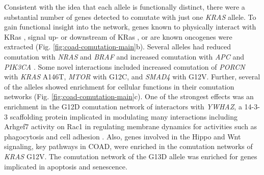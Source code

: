\documentclass[english, 10pt, letterpaper]{article}
\newcommand{\KRAS}{\emph{KRAS}}
\newcommand{\kras}{KRas}
\begin{document}
Consistent with the idea that each allele is functionally distinct, there were a substantial number of genes detected to comutate with just one \KRAS{} allele.
To gain functional insight into the network, genes known to physically interact with \kras{} \cite{Kovalski2019}, signal up- or downstream of \kras{} \cite{Kanehisa2017, Kanehisa2016KEGGAnnotation.}, or are known oncogenes \cite{Bamford2004TheWebsite., Sondka2018} were extracted (Fig. \ref{fig:coad-comutation-main}b).
Several alleles had reduced comutation with \emph{NRAS} and \emph{BRAF} and increased comutation with \emph{APC} and \emph{PIK3CA} \cite{Sensi2006MutuallyMelanoma., Jauhri2017, Seth2009ConcomitantCancer., Cisowski2016, Janssen2006, Sakai2018, Kennedy2011, Wang2013, Green2015, Yeang2008CombinatorialCancer., CancerGenomeAtlasNetwork2012}. 
Some novel interactions included increased comutation of \emph{PORCN} with \KRAS{} A146T, \emph{MTOR} with G12C, and \emph{SMAD4} with G12V.
Further, several of the alleles showed enrichment for cellular functions in their comutation networks (Fig. \ref{fig:coad-comutation-main}c).
One of the strongest effects was an enrichment in the G12D comutation network of interactors with \emph{YWHAZ}, a 14-3-3 scaffolding protein implicated in modulating many interactions including Arhgef7 activity on Rac1 in regulating membrane dynamics for activities such as phagocytosis and cell adhesion \cite{Angrand2006TransgenicSignaling.}.
Also, genes involved in the Hippo and Wnt signaling, key pathways in COAD, were enriched in the comutation networks of \KRAS{} G12V.
The comutation network of the G13D allele was enriched for genes implicated in apoptosis and senescence.

\end{document}
